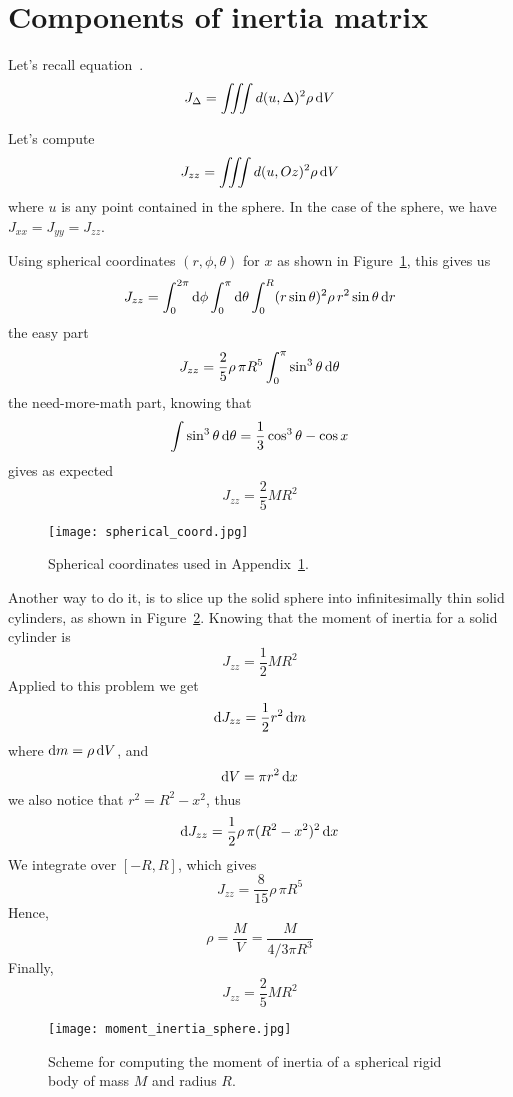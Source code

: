 \section{Components of inertia matrix}
\label{app:inertia_sphere}
Let's recall equation~.
\[ J_{\Delta} = \iiint d(u,\Delta)^2 \rho \operatorname{d}\! V \]

Let's compute
\[ J_{zz} = \iiint d(u,Oz)^2 \rho \operatorname{d}\! V \]
where $u$ is any point contained in the sphere.
In the case of the sphere, we have $J_{xx}=J_{yy}=J_{zz}$.

Using spherical coordinates $(r,\phi,\theta)$ for $x$
as shown in Figure~\ref{fig:sphere_coord}, this gives us
\[ 
  J_{zz} = \int_0^{2\pi} \operatorname{d}\! \phi \int_0^{\pi} \operatorname{d}\! \theta 
  \int_0^R (r \sin{\theta})^2 \rho\, r^2 \sin{\theta} \operatorname{d}\! r
\]
the easy part
\[ 
  J_{zz} = \frac{2}{5} \rho\,\pi R^5 \int_0^{\pi} \sin^3{\theta} \operatorname{d}\! \theta 
\]
the need-more-math part, knowing that
\[
  \int \sin^3{\theta} \operatorname{d}\! \theta
  = \frac{1}{3} \cos^3{\theta} - \cos{x}
\] 
gives as expected
\[
  J_{zz} = \frac{2}{5} M R^2
\]

\begin{figure}[h]
  \begin{center}
    \texttt{[image: spherical\_coord.jpg]}
    \caption{Spherical coordinates used 
    in Appendix~\ref{app:inertia_sphere}.}
    \label{fig:sphere_coord}
  \end{center}
\end{figure}

Another way to do it, is to slice up the solid sphere
into infinitesimally thin solid cylinders,
as shown in Figure~\ref{fig:moment_inertia_sphere}.
Knowing that the moment of inertia for a solid cylinder is 
\[ J_{zz} = \frac{1}{2}M R^2 \]
Applied to this problem we get
\[ \operatorname{d}\! J_{zz} = \frac{1}{2} r^2 \operatorname{d}\! m \]
where $\operatorname{d}\! m = \rho \operatorname{d}\! V$, and
\[ \operatorname{d}\! V = \pi r^2 \operatorname{d}\! x\]
we also notice that $r^2 = R^2 - x^2$, thus
\[ \operatorname{d}\! J_{zz} = \frac{1}{2} \rho \, \pi (R^2 - x^2)^2 \operatorname{d}\! x \]
We integrate over $[-R,R]$, which gives
\[ J_{zz} = \frac{8}{15} \rho \, \pi R^5 \]
Hence,
\[ \rho = \frac{M}{V} = \frac{M}{4/3 \pi R^3} \]
Finally,
\[ J_{zz} = \frac{2}{5} M R^2 \]

\begin{figure}
  \begin{center}
    \texttt{[image: moment\_inertia\_sphere.jpg]}
    \caption{Scheme for computing the moment of inertia of
    a spherical rigid body of mass $M$ and radius $R$.}
    \label{fig:moment_inertia_sphere}
  \end{center}
\end{figure}